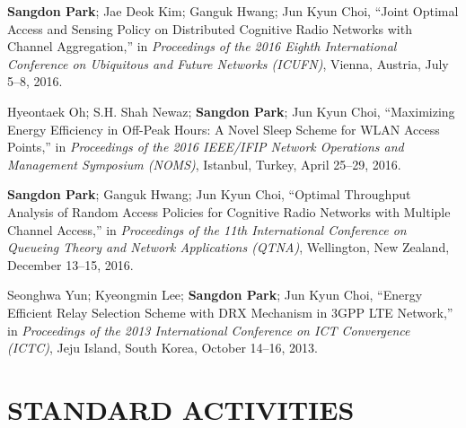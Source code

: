 \documentclass[11pt,a4paper]{article}
\begin{document}
\begin{enumerate}[label={[{\arabic*}]}, leftmargin=*, itemsep=0.3em]
\item \textbf{Sangdon Park}; Jae Deok Kim; Ganguk Hwang; Jun Kyun Choi, ``Joint Optimal Access and Sensing Policy on Distributed Cognitive Radio Networks with Channel Aggregation,'' in \textit{Proceedings of the 2016 Eighth International Conference on Ubiquitous and Future Networks (ICUFN)}, Vienna, Austria, July 5--8, 2016.

\item Hyeontaek Oh; S.H. Shah Newaz; \textbf{Sangdon Park}; Jun Kyun Choi, ``Maximizing Energy Efficiency in Off-Peak Hours: A Novel Sleep Scheme for WLAN Access Points,'' in \textit{Proceedings of the 2016 IEEE/IFIP Network Operations and Management Symposium (NOMS)}, Istanbul, Turkey, April 25--29, 2016.

\item \textbf{Sangdon Park}; Ganguk Hwang; Jun Kyun Choi, ``Optimal Throughput Analysis of Random Access Policies for Cognitive Radio Networks with Multiple Channel Access,'' in \textit{Proceedings of the 11th International Conference on Queueing Theory and Network Applications (QTNA)}, Wellington, New Zealand, December 13--15, 2016.

\item Seonghwa Yun; Kyeongmin Lee; \textbf{Sangdon Park}; Jun Kyun Choi, ``Energy Efficient Relay Selection Scheme with DRX Mechanism in 3GPP LTE Network,'' in \textit{Proceedings of the 2013 International Conference on ICT Convergence (ICTC)}, Jeju Island, South Korea, October 14--16, 2013.
\end{enumerate}

\section{STANDARD ACTIVITIES}
\end{document}
